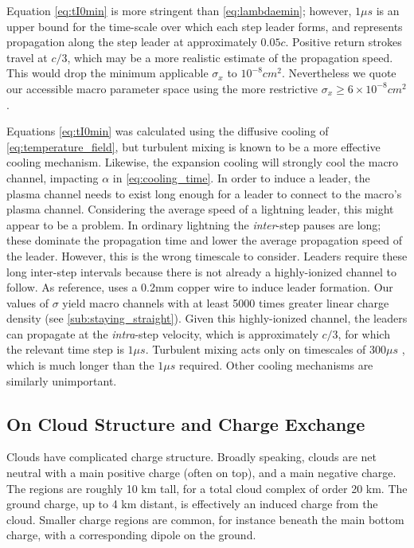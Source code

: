 \documentclass[%
 reprint,
 amsmath,amssymb,
 aps,
]{revtex4-2}
\begin{document}
        Equation \eqref{eq:tI0min} is more stringent than \eqref{eq:lambdaemin}; however, $1\mu{s}$ is an upper bound for the time-scale over which each step leader forms, and represents propagation along the step leader at approximately $0.05c$. Positive return strokes travel \citep{Idone1987} at $c/3$, which may be a more realistic estimate of the propagation speed. This would drop the minimum applicable $\sigma_x$ to $10^{-8}cm^2$. Nevertheless we quote our accessible macro parameter space using the more restrictive $\sigma_x \geq 6\times 10^{-8}cm^2$.
        
        Equations \eqref{eq:tI0min} was calculated using the diffusive cooling of \eqref{eq:temperature_field}, but turbulent mixing is known to be a more effective cooling mechanism. Likewise, the expansion cooling will strongly cool the macro channel, impacting $\alpha$ in \eqref{eq:cooling_time}. In order to induce a leader, the plasma channel needs to exist long enough for a leader to connect to the macro's plasma channel. Considering the average speed of a lightning leader, this might appear to be a problem. In ordinary lightning the \textit{inter}-step pauses are long; these dominate the propagation time and lower the average propagation speed of the leader. However, this is the wrong timescale to consider. Leaders require these long inter-step intervals because there is not already a highly-ionized channel to follow. As reference, \citeauthor{Betts2003} \citep{Betts2003} uses a 0.2mm copper wire to induce leader formation. Our values of $\sigma$ yield macro channels with at least 5000 times greater linear charge density (see \ref{sub:staying_straight}). Given this highly-ionized channel, the leaders can propagate at the \textit{intra}-step velocity, which is approximately $c/3$, for which the relevant time step is $1 \mu s$.
        Turbulent mixing acts only on timescales of $300\mu{s}$ \citep{Picone1983}, which is much longer than the $1\mu{s}$ required. Other cooling mechanisms are similarly unimportant.


    \subsection{On Cloud Structure and Charge Exchange}

        Clouds have complicated charge structure. Broadly speaking, clouds are net neutral with a main positive charge (often on top), and a main negative charge. The regions are roughly 10 km tall, for a total cloud complex of order 20 km. The ground charge, up to 4 km distant, is effectively an induced charge from the cloud. Smaller charge regions are common, for instance beneath the main bottom charge, with a corresponding dipole on the ground.
        
\end{document}
